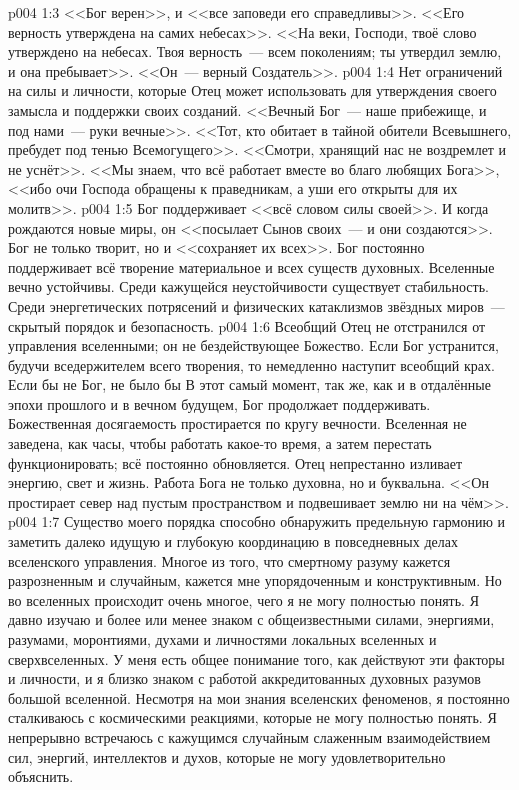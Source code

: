 \vs p004 1:3 <<Бог верен>>, и <<все заповеди его справедливы>>. <<Его верность утверждена на самих небесах>>. <<На веки, Господи, твоё слово утверждено на небесах. Твоя верность~--- всем поколениям; ты утвердил землю, и она пребывает>>. <<Он~--- верный Создатель>>.
\vs p004 1:4 Нет ограничений на силы и личности, которые Отец может использовать для утверждения своего замысла и поддержки своих созданий. <<Вечный Бог~--- наше прибежище, и под нами~--- руки вечные>>. <<Тот, кто обитает в тайной обители Всевышнего, пребудет под тенью Всемогущего>>. <<Смотри, хранящий нас не воздремлет и не уснёт>>. <<Мы знаем, что всё работает вместе во благо любящих Бога>>, <<ибо очи Господа обращены к праведникам, а уши его открыты для их молитв>>.
\vs p004 1:5 Бог поддерживает <<всё словом силы своей>>. И когда рождаются новые миры, он <<посылает Сынов своих~--- и они создаются>>. Бог не только творит, но и <<сохраняет их всех>>. Бог постоянно поддерживает всё творение материальное и всех существ духовных. Вселенные вечно устойчивы. Среди кажущейся неустойчивости существует стабильность. Среди энергетических потрясений и физических катаклизмов звёздных миров~--- скрытый порядок и безопасность.
\vs p004 1:6 Всеобщий Отец не отстранился от управления вселенными; он не бездействующее Божество. Если Бог устранится, будучи вседержителем всего творения, то немедленно наступит всеобщий крах. Если бы не Бог, не было бы  В этот самый момент, так же, как и в отдалённые эпохи прошлого и в вечном будущем, Бог продолжает поддерживать. Божественная досягаемость простирается по кругу вечности. Вселенная не заведена, как часы, чтобы работать какое\hyp{}то время, а затем перестать функционировать; всё постоянно обновляется. Отец непрестанно изливает энергию, свет и жизнь. Работа Бога не только духовна, но и буквальна. <<Он простирает север над пустым пространством и подвешивает землю ни на чём>>.
\vs p004 1:7 \pc Существо моего порядка способно обнаружить предельную гармонию и заметить далеко идущую и глубокую координацию в повседневных делах вселенского управления. Многое из того, что смертному разуму кажется разрозненным и случайным, кажется мне упорядоченным и конструктивным. Но во вселенных происходит очень многое, чего я не могу полностью понять. Я давно изучаю и более или менее знаком с общеизвестными силами, энергиями, разумами, моронтиями, духами и личностями локальных вселенных и сверхвселенных. У меня есть общее понимание того, как действуют эти факторы и личности, и я близко знаком с работой аккредитованных духовных разумов большой вселенной. Несмотря на мои знания вселенских феноменов, я постоянно сталкиваюсь с космическими реакциями, которые не могу полностью понять. Я непрерывно встречаюсь с кажущимся случайным слаженным взаимодействием сил, энергий, интеллектов и духов, которые не могу удовлетворительно объяснить.
